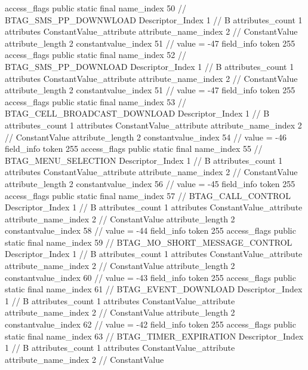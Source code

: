 {{{{{				access_flags	public static final
				name_index	50		// BTAG_SMS_PP_DOWNWLOAD
				Descriptor_Index	1		// B
				attributes_count	1
				attributes {
				ConstantValue_attribute {
					attribute_name_index	2		// ConstantValue
					attribute_length	2
					constantvalue_index	51		// value = -47
				}
				}
			}
			field_info {
				token	255
				access_flags	public static final
				name_index	52		// BTAG_SMS_PP_DOWNLOAD
				Descriptor_Index	1		// B
				attributes_count	1
				attributes {
				ConstantValue_attribute {
					attribute_name_index	2		// ConstantValue
					attribute_length	2
					constantvalue_index	51		// value = -47
				}
				}
			}
			field_info {
				token	255
				access_flags	public static final
				name_index	53		// BTAG_CELL_BROADCAST_DOWNLOAD
				Descriptor_Index	1		// B
				attributes_count	1
				attributes {
				ConstantValue_attribute {
					attribute_name_index	2		// ConstantValue
					attribute_length	2
					constantvalue_index	54		// value = -46
				}
				}
			}
			field_info {
				token	255
				access_flags	public static final
				name_index	55		// BTAG_MENU_SELECTION
				Descriptor_Index	1		// B
				attributes_count	1
				attributes {
				ConstantValue_attribute {
					attribute_name_index	2		// ConstantValue
					attribute_length	2
					constantvalue_index	56		// value = -45
				}
				}
			}
			field_info {
				token	255
				access_flags	public static final
				name_index	57		// BTAG_CALL_CONTROL
				Descriptor_Index	1		// B
				attributes_count	1
				attributes {
				ConstantValue_attribute {
					attribute_name_index	2		// ConstantValue
					attribute_length	2
					constantvalue_index	58		// value = -44
				}
				}
			}
			field_info {
				token	255
				access_flags	public static final
				name_index	59		// BTAG_MO_SHORT_MESSAGE_CONTROL
				Descriptor_Index	1		// B
				attributes_count	1
				attributes {
				ConstantValue_attribute {
					attribute_name_index	2		// ConstantValue
					attribute_length	2
					constantvalue_index	60		// value = -43
				}
				}
			}
			field_info {
				token	255
				access_flags	public static final
				name_index	61		// BTAG_EVENT_DOWNLOAD
				Descriptor_Index	1		// B
				attributes_count	1
				attributes {
				ConstantValue_attribute {
					attribute_name_index	2		// ConstantValue
					attribute_length	2
					constantvalue_index	62		// value = -42
				}
				}
			}
			field_info {
				token	255
				access_flags	public static final
				name_index	63		// BTAG_TIMER_EXPIRATION
				Descriptor_Index	1		// B
				attributes_count	1
				attributes {
				ConstantValue_attribute {
					attribute_name_index	2		// ConstantValue
}}}}}}}
